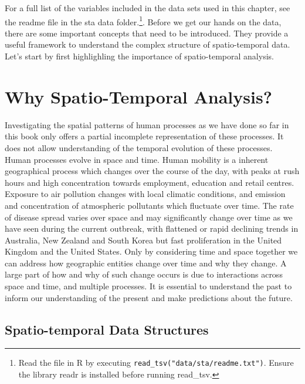 \documentclass[
  letterpaper,
  DIV=11,
  numbers=noendperiod,
  oneside]{scrreprt}
\begin{document}
For a full list of the variables included in the data sets used in this
chapter, see the readme file in the sta data folder.\footnote{Read the
  file in R by executing \texttt{read\_tsv("data/sta/readme.txt")}.
  Ensure the library readr is installed before running read\_tsv.}.
Before we get our hands on the data, there are some important concepts
that need to be introduced. They provide a useful framework to
understand the complex structure of spatio-temporal data. Let's start by
first highlighling the importance of spatio-temporal analysis.

\section{Why Spatio-Temporal
Analysis?}\label{why-spatio-temporal-analysis}

Investigating the spatial patterns of human processes as we have done so
far in this book only offers a partial incomplete representation of
these processes. It does not allow understanding of the temporal
evolution of these processes. Human processes evolve in space and time.
Human mobility is a inherent geographical process which changes over the
course of the day, with peaks at rush hours and high concentration
towards employment, education and retail centres. Exposure to air
pollution changes with local climatic conditions, and emission and
concentration of atmospheric pollutants which fluctuate over time. The
rate of disease spread varies over space and may significantly change
over time as we have seen during the current outbreak, with flattened or
rapid declining trends in Australia, New Zealand and South Korea but
fast proliferation in the United Kingdom and the United States. Only by
considering time and space together we can address how geographic
entities change over time and why they change. A large part of how and
why of such change occurs is due to interactions across space and time,
and multiple processes. It is essential to understand the past to inform
our understanding of the present and make predictions about the future.

\subsection{Spatio-temporal Data
Structures}\label{spatio-temporal-data-structures}
\end{document}
